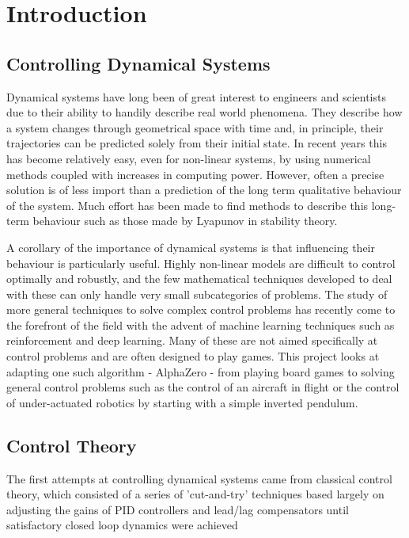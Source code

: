 \documentclass[12pt]{report}
\begin{document}
\tableofcontents{}

\chapter{Introduction}

\section{Controlling Dynamical Systems}
Dynamical systems have long been of great interest to engineers and scientists due to their ability to handily describe real world phenomena. They describe how a system changes through geometrical space with time and, in principle, their trajectories can be predicted solely from their initial state. In recent years this has become relatively easy, even for non-linear systems, by using numerical methods coupled with increases in computing power. However, often a precise solution is of less import than a prediction of the long term qualitative behaviour of the system. Much effort has been made to find methods to describe this long-term behaviour such as those made by Lyapunov in stability theory. 

A corollary of the importance of dynamical systems is that influencing their behaviour is particularly useful. Highly non-linear models are difficult to control optimally and robustly, and the few mathematical techniques developed to deal with these can only handle very small subcategories of problems. The study of more general techniques to solve complex control problems has recently come to the forefront of the field with the advent of machine learning techniques such as reinforcement and deep learning. Many of these are not aimed specifically at control problems and are often designed to play games. This project looks at adapting one such algorithm - AlphaZero - from playing board games to solving general control problems such as the control of an aircraft in flight or the control of under-actuated robotics by starting with a simple inverted pendulum.

\section{Control Theory}
The first attempts at controlling dynamical systems came from classical control theory, which consisted of a series of 'cut-and-try' techniques based largely on adjusting the gains of PID controllers and lead/lag compensators until satisfactory closed loop dynamics were achieved \cite{History}
\end{document}
